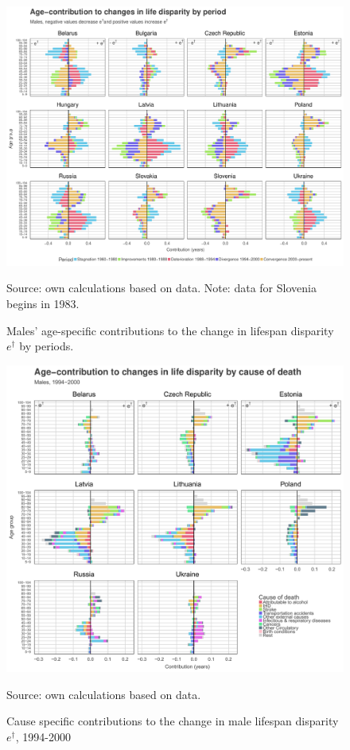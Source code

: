 \documentclass{article}
\begin{document}
\begin{figure}[h!]
\caption{Males' age-specific contributions to the change in lifespan disparity $e^\dagger$ by periods.}
\label{MalesDecomp}
\centering
\begin{center}
\includegraphics[scale=.52]{Figures/Age_ed_decomp_Males.pdf}
\end{center}
Source: own calculations based on \citet{HMD} data. Note: data for Slovenia begins in 1983.
\end{figure}

\newpage

\begin{figure}[h!]
\caption{Cause specific contributions to the change in  male lifespan disparity  $e^\dagger$, 1994-2000}
\label{Males_causes_1994}
\centering
\begin{center}
\includegraphics[scale=.53]{Figures/Cause_ed_decomp_Males_1.pdf}
\end{center}
Source: own calculations based on \citet{HcO} data. 
\end{figure}
\end{document}
